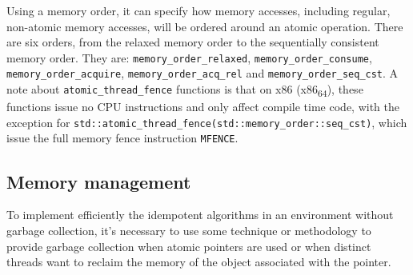 Using a memory order\cite{memoryOrderCpp2020}, it can specify how memory accesses, including regular, non-atomic memory accesses, will be
ordered around an atomic operation. There are six orders, from the
relaxed memory order to the sequentially consistent memory order. They are:
\texttt{memory\_order\_relaxed}, \texttt{memory\_order\_consume}, \texttt{memory\_order\_acquire},
\texttt{memory\_order\_acq\_rel} and \texttt{memory\_order\_seq\_cst}. A note about
\texttt{atomic\_thread\_fence} functions is that on x86 (x86\textsubscript{64}), these functions
issue no CPU instructions and only affect compile time code, with the exception
for \texttt{std::atomic\_thread\_fence(std::memory\_order::seq\_cst)}, which issue the
full memory fence instruction \texttt{MFENCE}.

\subsection{Memory management}
\label{sec:org1ca9ee9}

To implement efficiently the idempotent algorithms in an environment without
garbage collection, it's necessary to use some technique or methodology to
provide garbage collection when atomic pointers are used or when distinct
threads want to reclaim the memory of the object associated with the pointer.

